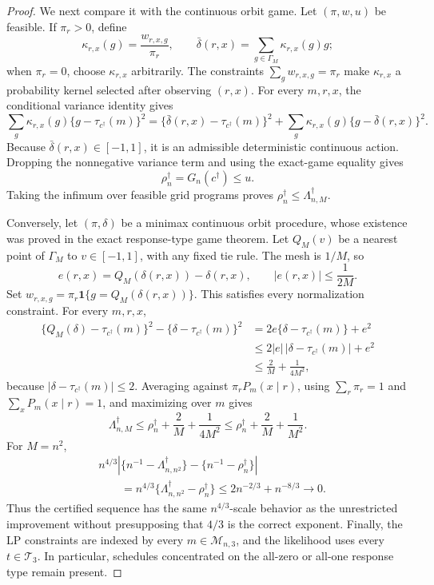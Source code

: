 \documentclass{article}
\begin{document}
\begin{proof}
We next compare it with the continuous orbit game.  Let \((\pi,w,u)\) be feasible.  If \(\pi_r>0\), define
\[
 \kappa_{r,x}(g)=\frac{w_{r,x,g}}{\pi_r},
 \qquad
 \bar\delta(r,x)=\sum_{g\in\Gamma_M}\kappa_{r,x}(g)g;
\]
when \(\pi_r=0\), choose \(\kappa_{r,x}\) arbitrarily.  The constraints
\(\sum_gw_{r,x,g}=\pi_r\) make \(\kappa_{r,x}\) a probability kernel selected after observing \((r,x)\).  For every \(m,r,x\), the conditional variance identity gives
\[
 \sum_g\kappa_{r,x}(g)\{g-\tau_{c^\dagger}(m)\}^2
 =\{\bar\delta(r,x)-\tau_{c^\dagger}(m)\}^2
 +\sum_g\kappa_{r,x}(g)\{g-\bar\delta(r,x)\}^2.
\]
Because \(\bar\delta(r,x)\in[-1,1]\), it is an admissible deterministic continuous action.  Dropping the nonnegative variance term and using the exact-game equality gives
\[
 \rho_n^\dagger=G_n(c^\dagger)\le u.
\]
Taking the infimum over feasible grid programs proves
\(\rho_n^\dagger\le\Lambda_{n,M}^\dagger\).

Conversely, let \((\pi,\delta)\) be a minimax continuous orbit procedure, whose existence was proved in the exact response-type game theorem.  Let \(Q_M(v)\) be a nearest point of \(\Gamma_M\) to \(v\in[-1,1]\), with any fixed tie rule.  The mesh is \(1/M\), so
\[
 e(r,x)=Q_M(\delta(r,x))-\delta(r,x),
 \qquad |e(r,x)|\le\frac1{2M}.
\]
Set
\(w_{r,x,g}=\pi_r\mathbf 1\{g=Q_M(\delta(r,x))\}\).  This satisfies every normalization constraint.  For every \(m,r,x\),
\[
 \begin{aligned}
 \{Q_M(\delta)-\tau_{c^\dagger}(m)\}^2
 -\{\delta-\tau_{c^\dagger}(m)\}^2
 &=2e\{\delta-\tau_{c^\dagger}(m)\}+e^2\\
 &\le2|e|\,|\delta-\tau_{c^\dagger}(m)|+e^2\\
 &\le\frac2M+\frac1{4M^2},
 \end{aligned}
\]
because \(|\delta-\tau_{c^\dagger}(m)|\le2\).  Averaging against \(\pi_rP_m(x\mid r)\), using \(\sum_r\pi_r=1\) and \(\sum_xP_m(x\mid r)=1\), and maximizing over \(m\) gives
\[
 \Lambda_{n,M}^\dagger
 \le\rho_n^\dagger+\frac2M+\frac1{4M^2}
 \le\rho_n^\dagger+\frac2M+\frac1{M^2}.
\]
For \(M=n^2\),
\[
 \begin{aligned}
 &n^{4/3}\left|\{n^{-1}-\Lambda_{n,n^2}^\dagger\}
 -\{n^{-1}-\rho_n^\dagger\}\right|\\
 &\qquad=n^{4/3}\{\Lambda_{n,n^2}^\dagger-\rho_n^\dagger\}
 \le2n^{-2/3}+n^{-8/3}\longrightarrow0.
 \end{aligned}
\]
Thus the certified sequence has the same \(n^{4/3}\)-scale behavior as the unrestricted improvement without presupposing that \(4/3\) is the correct exponent.  Finally, the LP constraints are indexed by every \(m\in\mathcal M_{n,3}\), and the likelihood uses every \(t\in\mathcal T_3\).  In particular, schedules concentrated on the all-zero or all-one response type remain present.
\end{proof}
\end{document}
